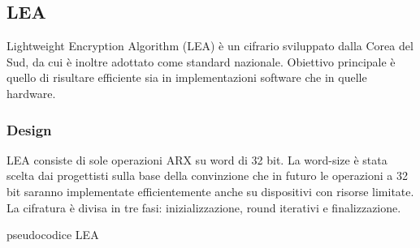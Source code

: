 \documentclass[target=bach,aauheader=,style=]{thud}
\begin{document}
		\subsection{LEA}\cite{lea}
		Lightweight Encryption Algorithm (LEA) è un cifrario sviluppato dalla Corea del Sud, da cui è inoltre adottato come standard nazionale. Obiettivo principale è quello di risultare efficiente sia in implementazioni software che in quelle hardware.
			\subsubsection{Design}
			LEA consiste di sole operazioni ARX su word di 32 bit. La word-size è stata scelta dai progettisti sulla base della convinzione che in futuro le operazioni a 32 bit saranno implementate efficientemente anche su dispositivi con risorse limitate.
			La cifratura è divisa in tre fasi: inizializzazione, round iterativi e finalizzazione.
			\begin{algorithm}
				\caption{pseudocodice LEA}
				\begin{algorithmic}
						\EndFor
					\EndProcedure
				\end{algorithmic}
			\end{algorithm}
			
\end{document}
